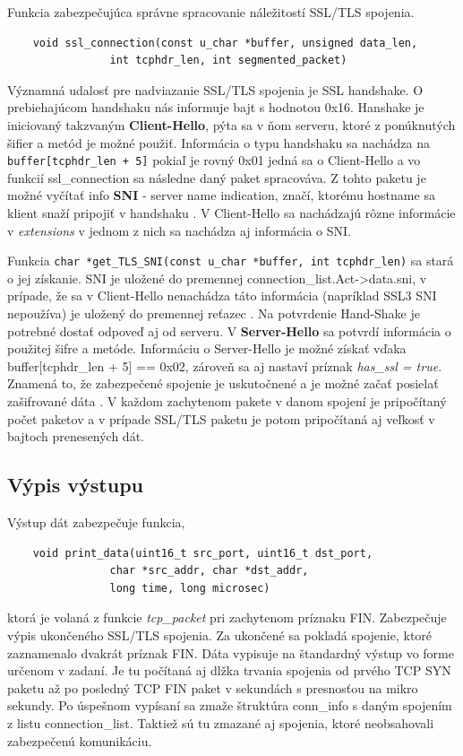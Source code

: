 \documentclass[11pt, a4paper]{article}
\begin{document}
	Funkcia zabezpečujúca správne spracovanie náležitostí SSL/TLS spojenia.
\begin{lstlisting}
	void ssl_connection(const u_char *buffer, unsigned data_len, 
				int tcphdr_len, int segmented_packet)
\end{lstlisting}
	
	Významná udalosť pre nadviazanie SSL/TLS spojenia je SSL handshake. O prebiehajúcom handshaku nás informuje bajt s hodnotou 0x16. Hanshake je iniciovaný takzvaným \textbf{Client-Hello}, pýta sa v ňom serveru, ktoré z ponúknutých šifier a metód je možné použiť. Informácia o typu handshaku sa nachádza na \texttt{buffer[tcphdr\_len + 5]} pokiaľ je rovný 0x01 jedná sa o Client-Hello a vo funkcií ssl\_connection sa následne daný paket spracováva. Z tohto paketu je možné vyčítať info \textbf{SNI} - server name indication, značí, ktorému hostname sa klient snaží pripojiť v handshaku \cite{wikiSNI}. V Client-Hello sa nachádzajú rôzne informácie v \emph{extensions} v jednom z nich sa nachádza aj informácia o SNI. 
	
Funkcia \texttt{char *get\_TLS\_SNI(const u\_char *buffer, int tcphdr\_len)} sa stará o jej získanie. SNI je uložené do premennej connection\_list.Act->data.sni, v prípade, že sa v Client-Hello nenachádza táto informácia (napríklad SSL3 SNI nepoužíva) je uložený do premennej reťazec . 
	Na potvrdenie Hand-Shake je potrebné dostať odpoveď aj od serveru. V \textbf{Server-Hello} sa potvrdí informácia o použitej šifre a metóde. Informáciu o Server-Hello je možné získať vďaka buffer[tcphdr\_len + 5] == 0x02, zároveň sa aj nastaví príznak \emph{has\_ssl = true}. Znamená to, že zabezpečené spojenie je uskutočnené a je možné začať posielať zašifrované dáta \cite{ssltraffic}. 
	V každom zachytenom pakete v danom spojení je pripočítaný počet paketov a v prípade SSL/TLS paketu je potom pripočítaná aj veľkosť v bajtoch prenesených dát.
	
	\subsection{Výpis výstupu}
	Výstup dát zabezpečuje funkcia,
	\begin{lstlisting}
	void print_data(uint16_t src_port, uint16_t dst_port, 
				char *src_addr, char *dst_addr, 
				long time, long microsec)
	\end{lstlisting}
	ktorá je volaná z funkcie \emph{tcp\_packet} pri zachytenom príznaku FIN. Zabezpečuje výpis ukončeného SSL/TLS spojenia. Za ukončené sa pokladá spojenie, ktoré zaznamenalo dvakrát príznak FIN. Dáta vypisuje na štandardný výstup vo forme určenom v zadaní. Je tu počítaná aj dlžka trvania spojenia od prvého TCP SYN paketu až po posledný TCP FIN paket v sekundách s presnosťou na mikro sekundy. Po úspešnom vypísaní sa zmaže štruktúra conn\_info s daným spojením z listu connection\_list. Taktiež sú tu zmazané aj spojenia, ktoré neobsahovali zabezpečenú komunikáciu. 
\end{document}

